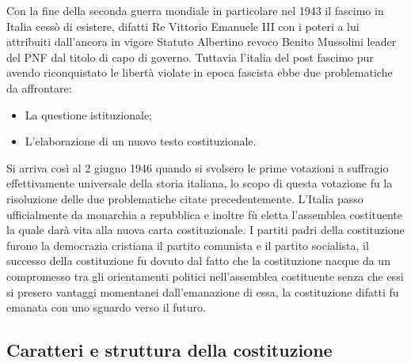 \documentclass{report}
\begin{document}
Con la fine della seconda guerra mondiale in particolare nel 1943 il fascimo in Italia cessò di esistere, difatti Re Vittorio Emanuele III con i poteri a lui attribuiti dall'ancora in vigore Statuto Albertino revoco Benito Mussolini leader del PNF dal titolo di capo di governo.
Tuttavia l'italia del post fascimo pur avendo riconquistato le libertà violate in epoca fascista ebbe due problematiche da affrontare: 
\begin{itemize}
  \item La questione istituzionale;
  \item L'elaborazione di un nuovo testo costituzionale.
\end{itemize}
Si arriva così al 2 giugno 1946 quando si svolsero le prime votazioni a suffragio effettivamente universale della storia italiana, lo scopo di questa votazione fu la risoluzione delle due problematiche citate precedentemente. L'Italia passo ufficialmente da monarchia a repubblica e inoltre fù eletta l'assemblea costituente la quale darà vita alla nuova carta costituzionale.
I partiti padri della costituzione furono la democrazia cristiana il partito comunista e il partito socialista, il successo della costituzione fu dovuto dal fatto che la costituzione nacque da un compromesso tra gli orientamenti politici nell'assemblea costituente senza che essi si presero vantaggi momentanei dall'emanazione di essa, la costituzione difatti fu emanata con uno sguardo verso il futuro.

\subsection{Caratteri e struttura della costituzione}
\end{document}
